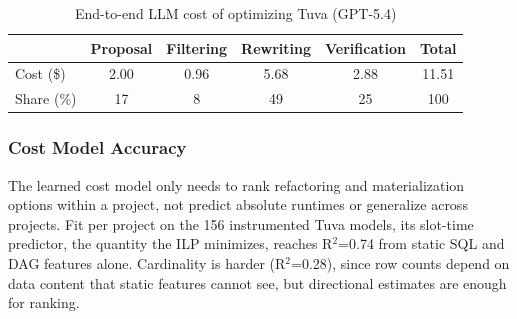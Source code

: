 \begin{table}[tb]
\centering
\caption{End-to-end LLM cost of optimizing Tuva (GPT-5.4)}
\label{tab:llmcost}
\small
\begin{tabular}{lccccc}
\toprule
 & Proposal & Filtering & Rewriting & Verification & Total \\
\midrule
Cost (\$)  & 2.00 & 0.96 & 5.68 & 2.88 & 11.51 \\
Share (\%) & 17   & 8    & 49   & 25   & 100 \\
\bottomrule
\end{tabular}
\inv
\end{table}
\inv

\subsubsection{Cost Model Accuracy}
\label{sec:eval-cost-model}

The learned cost model only needs to rank refactoring and materialization options within a project, not predict absolute runtimes or generalize across projects. Fit per project on the 156 instrumented Tuva models, its slot-time predictor, the quantity the ILP minimizes, reaches R$^2$=0.74 from static SQL and DAG features alone. Cardinality is harder (R$^2$=0.28), since row counts depend on data content that static features cannot see, but directional estimates are enough for ranking.
